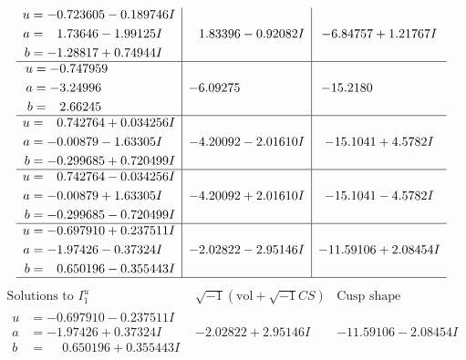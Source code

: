 \documentclass[1p]{elsarticle_modified}
\theoremstyle{definition}
\newcommand{\I}{\sqrt{-1}}
\begin{document}
$$\begin{array}{c|c|c}
\begin{aligned}
u &= -0.723605 - 0.189746 I \\
a &= \phantom{-}1.73646 - 1.99125 I \\
b &= -1.28817 + 0.74944 I\end{aligned}
 & \phantom{-}1.83396 - 0.92082 I & -6.84757 + 1.21767 I \\ \hline\begin{aligned}
u &= -0.747959\phantom{ +0.000000I} \\
a &= -3.24996\phantom{ +0.000000I} \\
b &= \phantom{-}2.66245\phantom{ +0.000000I}\end{aligned}
 & -6.09275\phantom{ +0.000000I} & -15.2180\phantom{ +0.000000I} \\ \hline\begin{aligned}
u &= \phantom{-}0.742764 + 0.034256 I \\
a &= -0.00879 - 1.63305 I \\
b &= -0.299685 + 0.720499 I\end{aligned}
 & -4.20092 - 2.01610 I & -15.1041 + 4.5782 I \\ \hline\begin{aligned}
u &= \phantom{-}0.742764 - 0.034256 I \\
a &= -0.00879 + 1.63305 I \\
b &= -0.299685 - 0.720499 I\end{aligned}
 & -4.20092 + 2.01610 I & -15.1041 - 4.5782 I \\ \hline\begin{aligned}
u &= -0.697910 + 0.237511 I \\
a &= -1.97426 - 0.37324 I \\
b &= \phantom{-}0.650196 - 0.355443 I\end{aligned}
 & -2.02822 - 2.95146 I & -11.59106 + 2.08454 I\\
 \hline 
 \end{array}$$\newpage$$\begin{array}{c|c|c}  
\text{Solutions to }I^u_{1}& \I (\text{vol} + \sqrt{-1}CS) & \text{Cusp shape}\\
 \hline 
\begin{aligned}
u &= -0.697910 - 0.237511 I \\
a &= -1.97426 + 0.37324 I \\
b &= \phantom{-}0.650196 + 0.355443 I\end{aligned}
 & -2.02822 + 2.95146 I & -11.59106 - 2.08454 I \\ \hline\begin{aligned}

\end{aligned}
\end{array}$$
\end{document}

